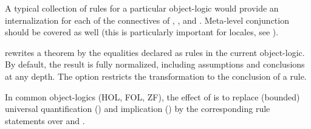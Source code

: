 \begin{isabellebody}
\begin{isamarkuptext}
\begin{descr}
  A typical collection of \hyperlink{attribute.atomize}{\mbox{}} rules for a particular
  object-logic would provide an internalization for each of the
  connectives of \isa{{\isachardoublequote}{\isasymAnd}{\isachardoublequote}}, \isa{{\isachardoublequote}{\isasymLongrightarrow}{\isachardoublequote}}, and \isa{{\isachardoublequote}{\isasymequiv}{\isachardoublequote}}.
  Meta-level conjunction should be covered as well (this is
  particularly important for locales, see ).

  \item [\hyperlink{attribute.rule_format}{\mbox{\isa{rule{\isacharunderscore}format}}}] rewrites a theorem by the
  equalities declared as \hyperlink{attribute.rulify}{\mbox{}} rules in the current
  object-logic.  By default, the result is fully normalized, including
  assumptions and conclusions at any depth.  The 
  option restricts the transformation to the conclusion of a rule.

  In common object-logics (HOL, FOL, ZF), the effect of \hyperlink{attribute.rule_format}{\mbox{}} is to replace (bounded) universal quantification
  (\isa{{\isachardoublequote}{\isasymforall}{\isachardoublequote}}) and implication (\isa{{\isachardoublequote}{\isasymlongrightarrow}{\isachardoublequote}}) by the corresponding
  rule statements over \isa{{\isachardoublequote}{\isasymAnd}{\isachardoublequote}} and \isa{{\isachardoublequote}{\isasymLongrightarrow}{\isachardoublequote}}.

  \end{descr}%
\end{isamarkuptext}%
\isamarkuptrue%
%
\isadelimtheory
%
\endisadelimtheory
%
\isatagtheory
{}\isamarkupfalse%
%
\endisatagtheory
{\isafoldtheory}%
%
\isadelimtheory
%
\endisadelimtheory
\isanewline
\end{isabellebody}%
